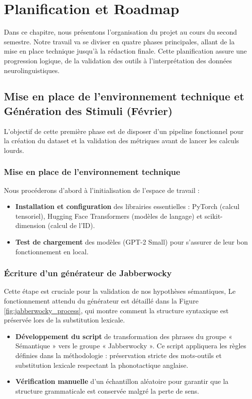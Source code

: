 \chapter{Planification et Roadmap}

Dans ce chapitre, nous présentons l'organisation du projet au cours du second semestre. Notre travail va se diviser en quatre phases principales, allant de la mise en place technique jusqu'à la rédaction finale. Cette planification assure une progression logique, de la validation des outils à l'interprétation des données neurolinguistiques.

\section{Mise en place de l'environnement technique et Génération des Stimuli (Février)}

L'objectif de cette première phase est de disposer d'un pipeline fonctionnel pour la création du dataset et la validation des métriques avant de lancer les calculs lourds.

\subsection{Mise en place de l'environnement technique}
Nous procéderons d'abord à l'initialisation de l'espace de travail :
\begin{itemize}
    \item \textbf{Installation et configuration} des librairies essentielles : PyTorch (calcul tensoriel), Hugging Face Transformers (modèles de langage) et scikit-dimension (calcul de l'ID).
    \item \textbf{Test de chargement} des modèles (GPT-2 Small) pour s'assurer de leur bon fonctionnement en local.
\end{itemize}

\subsection{Écriture d'un générateur de Jabberwocky}
Cette étape est cruciale pour la validation de nos hypothèses sémantiques, Le fonctionnement attendu du générateur est détaillé dans la Figure \ref{fig:jabberwocky_process}, qui montre comment la structure syntaxique est préservée lors de la substitution lexicale.

\begin{itemize}
    \item \textbf{Développement du script} de transformation des phrases du groupe « Sémantique » vers le groupe « Jabberwocky ». Ce script appliquera les règles définies dans la méthodologie : préservation stricte des mots-outils et substitution lexicale respectant la phonotactique anglaise.
    \item \textbf{Vérification manuelle} d'un échantillon aléatoire pour garantir que la structure grammaticale est conservée malgré la perte de sens.
\end{itemize}

